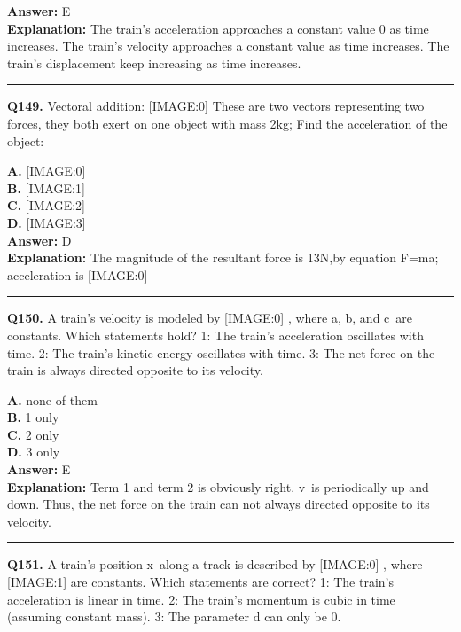 \documentclass[12pt]{article}
\begin{document}
\textbf{Answer:} E \\
\textbf{Explanation:} The train's acceleration approaches a constant value 0 as time increases. The train's velocity approaches a constant value as time increases. The train's displacement keep increasing as time increases.

\hrule
\vspace{1em}


\noindent
\textbf{Q149.} Vectoral addition:
[IMAGE:0]
These are two vectors representing two forces, they both exert on one object with mass 2kg; Find the acceleration of the object:



\textbf{A.} [IMAGE:0] \\
\textbf{B.} [IMAGE:1] \\
\textbf{C.} [IMAGE:2] \\
\textbf{D.} [IMAGE:3] \\

\textbf{Answer:} D \\
\textbf{Explanation:} The magnitude of the resultant force is 13N,by equation F=ma; acceleration is
[IMAGE:0]

\hrule
\vspace{1em}


\noindent
\textbf{Q150.} A train's velocity is modeled by
[IMAGE:0]
, where a, b, and c are constants. Which statements hold?
1: The train's acceleration oscillates with time.
2: The train's kinetic energy oscillates with time.
3: The net force on the train is always directed opposite to its velocity.



\textbf{A.} none of them \\
\textbf{B.} 1 only \\
\textbf{C.} 2 only \\
\textbf{D.} 3 only \\

\textbf{Answer:} E \\
\textbf{Explanation:} Term 1 and term 2 is obviously right. v is periodically up and down. Thus, the net force on the train can not always directed opposite to its velocity.

\hrule
\vspace{1em}


\noindent
\textbf{Q151.} A train's position x along a track is described by
[IMAGE:0]
, where
[IMAGE:1]
are constants. Which statements are correct?
1: The train's acceleration is linear in time.
2: The train's momentum is cubic in time (assuming constant mass).
3: The parameter d can only be 0.
\end{document}
